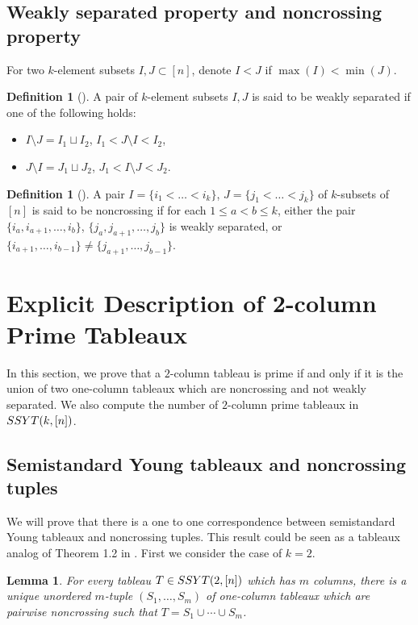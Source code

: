 \documentclass[12pt, reqno]{amsart}
\theoremstyle{plain}
\newtheorem{lemma}[theorem]{Lemma}
\theoremstyle{definition}
\newtheorem{definition}[theorem]{Definition}
\numberwithin{equation}{section}
\newcommand{\SSYT}{{\rm SSYT}}
\begin{document}
\subsection{Weakly separated property and noncrossing property} \label{subsec:weakly separated and noncrossing}

For two $k$-element subsets $I,J \subset [n]$, denote $I < J$ if $\max(I) < \min(J)$. 
\begin{definition} [{\cite{LZ98}}] \label{def:weakly separted k-subsets}
A pair of $k$-element subsets $I,J$ is said to be weakly separated if one of the following holds:
\begin{itemize}
\item $I\setminus J = I_1 \sqcup I_2$, $I_1 < J \setminus I <I_2$,
\item $J\setminus I = J_1 \sqcup J_2$, $J_1 < I \setminus J <J_2$. 
\end{itemize}
\end{definition}

\begin{definition}[{\cite{SSW17}}] \label{def:noncrossing pairs}
A pair $I=\{i_1< \ldots < i_k\}$, $J=\{j_1<\ldots<j_k\}$ of $k$-subsets of $[n]$ is said to be noncrossing if for each $1 \le a < b \le k$, either the pair $\{i_a, i_{a+1}, \ldots, i_b\}$, $\{j_a, j_{a+1}, \ldots, j_b\}$ is weakly separated, or $\{i_{a+1}, \ldots, i_{b-1}\} \ne \{j_{a+1}, \ldots, j_{b-1}\}$. 
\end{definition}


\section{Explicit Description of 2-column Prime Tableaux} \label{sec:prime modules corresponding to 2-column tableaux}

In this section, we prove that a $2$-column tableau is prime if and only if it is the union of two one-column tableaux which are noncrossing and not weakly separated. We also compute the number of $2$-column prime tableaux in $\SSYT(k, [n])$. 


\subsection{Semistandard Young tableaux and noncrossing tuples}

We will prove that there is a one to one correspondence between semistandard Young tableaux and noncrossing tuples. This result could be seen as a tableaux analog of Theorem 1.2 in \cite{E2021}. First we consider the case of $k=2$. 
\begin{lemma} \label{lem:semistandard tableau and noncrossing tuple k=2}
For every tableau $T \in {\rm SSYT}(2, [n])$ which has $m$ columns, there is a unique unordered $m$-tuple $(S_1, \ldots, S_m)$ of one-column tableaux which are pairwise noncrossing such that $T = S_1 \cup \cdots \cup S_m$. 
\end{lemma}
\end{document}
